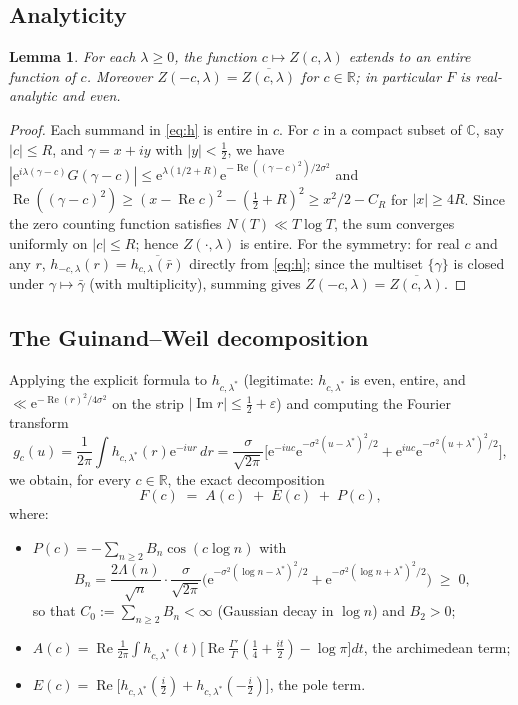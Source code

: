 \documentclass[11pt]{amsart}
\newtheorem{lemma}[theorem]{Lemma}
\theoremstyle{definition}
\theoremstyle{remark}
\newcommand{\CC}{\mathbb{C}}
\newcommand{\RR}{\mathbb{R}}
\newcommand{\eE}{\mathrm{e}}
\DeclareMathOperator{\Rre}{Re}
\DeclareMathOperator{\Iim}{Im}
\begin{document}
\subsection{Analyticity}
\begin{lemma}\label{lem:analytic}
For each $\lambda\ge0$, the function $c\mapsto Z(c,\lambda)$ extends to an entire function of $c$. Moreover $Z(-c,\lambda)=\overline{Z(c,\lambda)}$ for $c\in\RR$; in particular $F$ is real-analytic and even.
\end{lemma}

\begin{proof}
Each summand in \eqref{eq:h} is entire in $c$. For $c$ in a compact subset of $\CC$, say $|c|\le R$, and $\gamma=x+iy$ with $|y|<\tfrac12$, we have $|\eE^{i\lambda(\gamma-c)}G(\gamma-c)|\le \eE^{\lambda(1/2+R)}\eE^{-\Rre((\gamma-c)^2)/2\sigma^2}$ and $\Rre((\gamma-c)^2)\ge(x-\Rre c)^2-(\tfrac12+R)^2\ge x^2/2-C_R$ for $|x|\ge 4R$. Since the zero counting function satisfies $N(T)\ll T\log T$, the sum converges uniformly on $|c|\le R$; hence $Z(\cdot,\lambda)$ is entire. For the symmetry: for real $c$ and any $r$, $h_{-c,\lambda}(r)=\overline{h_{c,\lambda}(\bar r)}$ directly from \eqref{eq:h}; since the multiset $\{\gamma\}$ is closed under $\gamma\mapsto\bar\gamma$ (with multiplicity), summing gives $Z(-c,\lambda)=\overline{Z(c,\lambda)}$.
\end{proof}

\subsection{The Guinand--Weil decomposition}
Applying the explicit formula to $h_{c,\lambda^*}$ (legitimate: $h_{c,\lambda^*}$ is even, entire, and $\ll\eE^{-\Rre(r)^2/4\sigma^2}$ on the strip $|\Iim r|\le\tfrac12+\varepsilon$) and computing the Fourier transform
\[
g_c(u)=\frac1{2\pi}\int h_{c,\lambda^*}(r)\eE^{-iur}\,dr
=\frac{\sigma}{\sqrt{2\pi}}\Big[\eE^{-iuc}\eE^{-\sigma^2(u-\lambda^*)^2/2}+\eE^{iuc}\eE^{-\sigma^2(u+\lambda^*)^2/2}\Big],
\]
we obtain, for every $c\in\RR$, the exact decomposition
\begin{equation}\label{eq:decomp}
F(c)\;=\;A(c)\;+\;E(c)\;+\;P(c),
\end{equation}
where:
\begin{itemize}
\item[$\bullet$] $P(c)=-\sum_{n\ge2}B_n\cos(c\log n)$ with
\[
B_n=\frac{2\Lambda(n)}{\sqrt n}\cdot\frac{\sigma}{\sqrt{2\pi}}\Big(\eE^{-\sigma^2(\log n-\lambda^*)^2/2}+\eE^{-\sigma^2(\log n+\lambda^*)^2/2}\Big)\;\ge\;0 ,
\]
so that $C_0:=\sum_{n\ge2}B_n<\infty$ (Gaussian decay in $\log n$) and $B_2>0$;
\item[$\bullet$] $A(c)=\Rre\frac1{2\pi}\int h_{c,\lambda^*}(t)\big[\Rre\tfrac{\Gamma'}{\Gamma}(\tfrac14+\tfrac{it}2)-\log\pi\big]dt$, the archimedean term;
\item[$\bullet$] $E(c)=\Rre\big[h_{c,\lambda^*}(\tfrac i2)+h_{c,\lambda^*}(-\tfrac i2)\big]$, the pole term.
\end{itemize}
\end{document}
